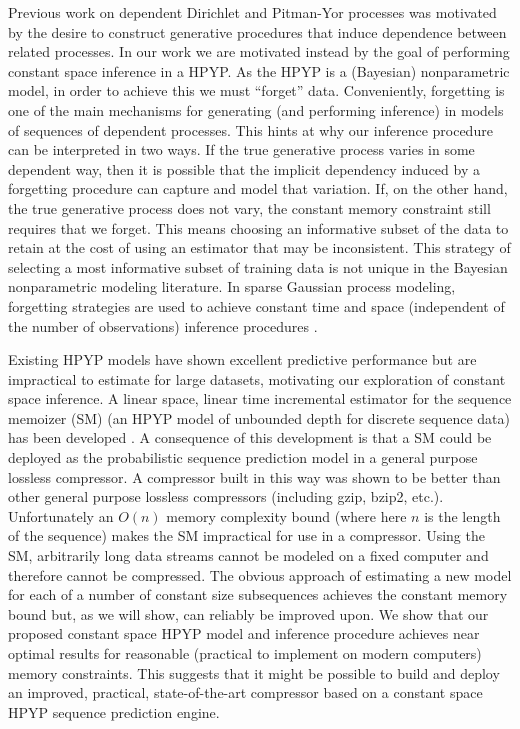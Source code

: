 Previous work on dependent Dirichlet and Pitman-Yor processes \cite{MacEachern2000, Srebro2005, Griffin2006, Caron2007, Caron2007a} was motivated by the desire to construct generative procedures that induce dependence between related processes.  In our work we are motivated instead by the goal of performing constant space inference in a HPYP.  As the HPYP is a (Bayesian) nonparametric model, in order to achieve this we must ``forget'' data.  Conveniently, forgetting is one of the main mechanisms for generating (and performing inference) in models of sequences of dependent processes.  This hints at why our inference procedure can be interpreted in two ways.  If the true generative process varies in some dependent way, then it is possible that the implicit dependency induced by a forgetting procedure can capture and model that variation.  If, on the other hand, the true generative process does not vary, the constant memory constraint still requires that we forget.  This means choosing an informative subset of the data to retain at the cost of using an estimator that may be inconsistent.  This strategy of selecting a most informative subset of training data is not unique in the Bayesian nonparametric modeling literature.  In sparse Gaussian process modeling, forgetting strategies are used to achieve constant time and space (independent of the number of observations) inference procedures \cite{ Lawrence2003, Csat'o2002, Snelson2006}.

 
Existing HPYP models have shown excellent predictive performance but are impractical to estimate for large datasets, motivating our exploration of constant space inference.  A linear space, linear time incremental estimator for the sequence memoizer (SM) \cite{Wood2009} (an HPYP model of unbounded depth for discrete sequence data) has been developed \cite{Gasthaus2010}.   A consequence of this development is that a SM could be deployed as the probabilistic sequence prediction model in a general purpose lossless compressor.   A compressor built in this way was shown to be better than other general purpose lossless compressors (including gzip, bzip2, etc.).  Unfortunately an $O(n)$ memory complexity bound (where here $n$ is the length of the sequence) makes the SM impractical for use in a compressor.  Using the SM, arbitrarily long data streams cannot be modeled on a fixed computer and therefore cannot be compressed.  The obvious approach of estimating a new model for each of a number of constant size subsequences achieves the constant memory bound but, as we will show, can reliably be improved upon.   We show that our proposed constant space HPYP model and inference procedure achieves near optimal results for reasonable (practical to implement on modern computers) memory constraints.  This suggests that it might be possible to build and deploy an improved, practical, state-of-the-art compressor based on a constant space HPYP sequence prediction engine.

